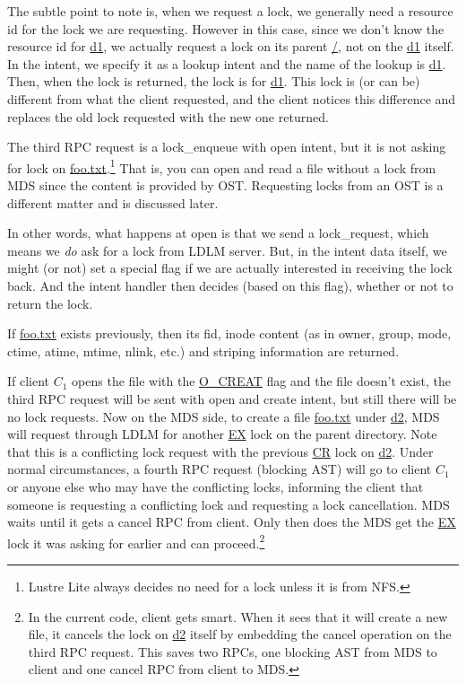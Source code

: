 The subtle point to note is, when we request a lock, we generally need a
resource id for the lock we are requesting. However in this case, since we
don't know the resource id for \url{d1}, we actually request a lock on its
parent \url{/}, not on the \url{d1} itself. In the intent, we specify it as a
lookup intent and the name of the lookup is \url{d1}. Then, when the lock is
returned, the lock is for \url{d1}. This lock is (or can be) different from
what the client requested, and the client notices this difference and replaces
the old lock requested with the new one returned.

The third RPC request is a lock\_enqueue with open intent, but it is not asking for
lock on \url{foo.txt}.\footnote{Lustre Lite always decides no need for a lock
unless it is from NFS.} That is, you can open and read a file without a lock
from MDS since the content is provided by OST.  Requesting locks from an OST is
a different matter and is discussed later.

In other words, what happens at open is that we send a lock\_request, which
means we \textit{do} ask for a lock from LDLM server.  But, in the intent data itself, we
might (or not) set a special flag if we are actually interested in receiving
the lock back. And the intent handler then decides (based on this flag),
whether or not to return the lock.


If \url{foo.txt} exists previously, then its  fid, inode content (as in owner,
group, mode, ctime, atime, mtime, nlink, etc.) and striping information are
returned.

If client $C_1$ opens the file with the \url{O_CREAT} flag and the file doesn't
exist, the third RPC request will be sent with open and create intent, but
still there will be no lock requests. Now on the MDS side, to create a file
\url{foo.txt} under \url{d2}, MDS will request through LDLM for another
\url{EX} lock on the parent directory. Note that this is a conflicting lock
request with the previous \url{CR} lock on \url{d2}. Under normal
circumstances, a fourth RPC request (blocking AST) will go to client $C_1$ or
anyone else who may have the conflicting locks, informing the client that
someone is requesting a conflicting lock and requesting a lock cancellation.
MDS waits until it gets a cancel RPC from client. Only then does the MDS get the
\url{EX} lock it was asking for earlier and can proceed.\footnote{In the current
code, client gets smart. When it sees that it will create a new file, it cancels
the lock on \url{d2} itself by embedding the cancel operation on the third RPC
request. This saves two RPCs, one blocking AST from MDS to client and one
cancel RPC from client to MDS.}
 

